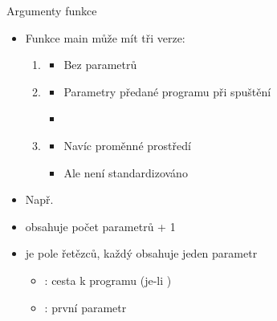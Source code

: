 \begin{frame}{Argumenty funkce }

  \begin{itemize}
    \item Funkce main může mít tři verze:
    \begin{enumerate}
      \item {}
      \begin{itemize}
	\item Bez parametrů
      \end{itemize}

      \pause

      \item {}
      \begin{itemize}
	\item Parametry předané programu při spuštění
	\item {}
      \end{itemize}

      \pause

      \item {}
      \begin{itemize}
	\item Navíc proměnné prostředí
	\item Ale není standardizováno
      \end{itemize}

    \end{enumerate}

    \item Např.\ 

    \pause

    \item {} obsahuje počet parametrů + 1

    \pause

    \item {} je pole řetězců, každý obsahuje jeden parametr
    \begin{itemize}
      \item {}: cesta k programu (je-li )
      \item {}: první parametr
    \end{itemize}
  \end{itemize}

\end{frame}

